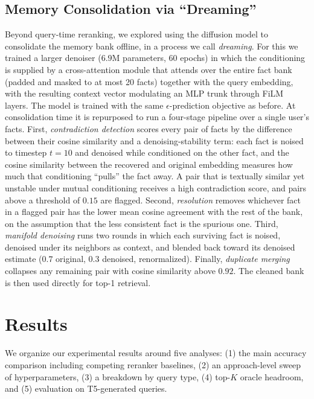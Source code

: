 \documentclass{article}
\begin{document}
\subsection{Memory Consolidation via ``Dreaming''}
\label{sec:dreaming}

Beyond query-time reranking, we explored using the diffusion model to consolidate the memory bank offline, in a process we call \emph{dreaming}. For this we trained a larger denoiser ($6.9$M parameters, 60 epochs) in which the conditioning is supplied by a cross-attention module that attends over the entire fact bank (padded and masked to at most 20 facts) together with the query embedding, with the resulting context vector modulating an MLP trunk through FiLM layers. The model is trained with the same $\epsilon$-prediction objective as before. At consolidation time it is repurposed to run a four-stage pipeline over a single user's facts. First, \emph{contradiction detection} scores every pair of facts by the difference between their cosine similarity and a denoising-stability term: each fact is noised to timestep $t=10$ and denoised while conditioned on the other fact, and the cosine similarity between the recovered and original embedding measures how much that conditioning ``pulls'' the fact away. A pair that is textually similar yet unstable under mutual conditioning receives a high contradiction score, and pairs above a threshold of $0.15$ are flagged. Second, \emph{resolution} removes whichever fact in a flagged pair has the lower mean cosine agreement with the rest of the bank, on the assumption that the less consistent fact is the spurious one. Third, \emph{manifold denoising} runs two rounds in which each surviving fact is noised, denoised under its neighbors as context, and blended back toward its denoised estimate ($0.7$ original, $0.3$ denoised, renormalized). Finally, \emph{duplicate merging} collapses any remaining pair with cosine similarity above $0.92$. The cleaned bank is then used directly for top-1 retrieval.
\section{Results}
\label{sec:results}

We organize our experimental results around five analyses: (1) the main accuracy comparison including competing reranker baselines, (2) an approach-level sweep of hyperparameters, (3) a breakdown by query type, (4) top-$K$ oracle headroom, and (5) evaluation on T5-generated queries.
\end{document}
